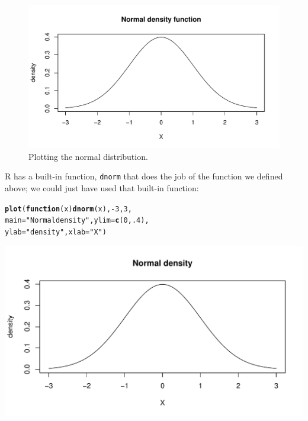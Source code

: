 \documentclass[12pt]{book}\usepackage[]{graphicx}\usepackage[]{color}
\makeatletter
\def\maxwidth{ %
  \ifdim\Gin@nat@width>\linewidth
    \linewidth
  \else
    \Gin@nat@width
  \fi
}
\newcommand{\hlnum}[1]{\textcolor[rgb]{0.686,0.059,0.569}{#1}}%
\newcommand{\hlstr}[1]{\textcolor[rgb]{0.192,0.494,0.8}{#1}}%
\newcommand{\hlopt}[1]{\textcolor[rgb]{0,0,0}{#1}}%
\newcommand{\hlstd}[1]{\textcolor[rgb]{0.345,0.345,0.345}{#1}}%
\newcommand{\hlkwa}[1]{\textcolor[rgb]{0.161,0.373,0.58}{\textbf{#1}}}%
\newcommand{\hlkwc}[1]{\textcolor[rgb]{0.333,0.667,0.333}{#1}}%
\newcommand{\hlkwd}[1]{\textcolor[rgb]{0.737,0.353,0.396}{\textbf{#1}}}%
\newenvironment{kframe}{%
 \def\at@end@of@kframe{}%
 \ifinner\ifhmode%
  \def\at@end@of@kframe{\end{minipage}}%
  \begin{minipage}{\columnwidth}%
 \fi\fi%
 \def\FrameCommand##1{\hskip\@totalleftmargin \hskip-\fboxsep
 \colorbox{shadecolor}{##1}\hskip-\fboxsep
     \hskip-\linewidth \hskip-\@totalleftmargin \hskip\columnwidth}%
 \MakeFramed {\advance\hsize-\width
   \@totalleftmargin\z@ \linewidth\hsize
   \@setminipage}}%
 {\par\unskip\endMakeFramed%
 \at@end@of@kframe}
\newenvironment{knitrout}{}{} %
\makeatother
\begin{document}
\begin{figure}
\begin{knitrout}
\color{fgcolor}
\includegraphics[width=\maxwidth]{figure/unnamed-chunk-6-1} 

\end{knitrout}
\caption{Plotting the normal distribution.}\label{norm1}
\end{figure}

R has a built-in function, \texttt{dnorm} that does the job of the function we defined above; we could just have used that built-in function:

\begin{knitrout}
\color{fgcolor}\begin{kframe}
\begin{alltt}
\hlkwd{plot}\hlstd{(}\hlkwa{function}\hlstd{(}\hlkwc{x}\hlstd{)} \hlkwd{dnorm}\hlstd{(x),} \hlopt{-}\hlnum{3}\hlstd{,} \hlnum{3}\hlstd{,}
      \hlkwc{main} \hlstd{=} \hlstr{"Normal density"}\hlstd{,}\hlkwc{ylim}\hlstd{=}\hlkwd{c}\hlstd{(}\hlnum{0}\hlstd{,}\hlnum{.4}\hlstd{),}
              \hlkwc{ylab}\hlstd{=}\hlstr{"density"}\hlstd{,}\hlkwc{xlab}\hlstd{=}\hlstr{"X"}\hlstd{)}
\end{alltt}
\end{kframe}
\includegraphics[width=\maxwidth]{figure/unnamed-chunk-7-1} 

\end{knitrout}
\end{document}
